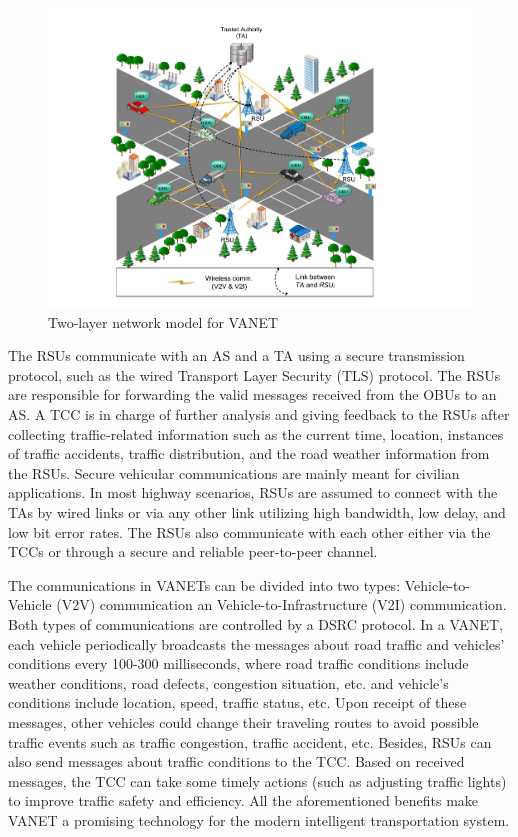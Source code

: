 \documentclass[10pt,journal,letterpaper]{IEEEtran}
\begin{document}
\begin{figure}[h]
    \centering
    \captionsetup{justification=centering}
    \includegraphics[scale=0.45]{Fig1(model).pdf}
    \caption{Two-layer network model for VANET}
    \label{fig1(model)}
\end{figure}
The RSUs communicate with an AS and a TA using a secure transmission
protocol, such as the wired Transport Layer Security (TLS) protocol.
The RSUs are responsible for forwarding the valid messages received
from the OBUs to an AS. A TCC is in charge of further analysis and
giving feedback to the RSUs after collecting traffic-related
information such as the current time, location, instances of traffic
accidents, traffic distribution, and the road weather information
from the RSUs. Secure vehicular communications are mainly meant for
civilian applications. In most highway scenarios, RSUs are assumed
to connect with the TAs by wired links or via any other link
utilizing high bandwidth, low delay, and low bit error rates. The
RSUs also communicate with each other either via the TCCs or through
a secure and reliable peer-to-peer channel.


The communications in VANETs can be divided into two types:
Vehicle-to-Vehicle (V2V) communication an Vehicle-to-Infrastructure
(V2I) communication. Both types of communications are controlled by
a DSRC protocol.  In a VANET, each vehicle periodically broadcasts
the messages about road traffic and vehicles' conditions every
100-300 milliseconds, where road traffic conditions include weather
conditions, road defects, congestion situation, etc. and vehicle's
conditions include location, speed, traffic status, etc.
Upon receipt of these messages, other vehicles could change their
traveling routes to avoid possible traffic events such as traffic
congestion, traffic accident, etc. Besides, RSUs can also send
messages about traffic conditions to the TCC. Based on received
messages, the TCC can take some timely actions (such as adjusting
traffic lights) to improve traffic safety and efficiency. All the
aforementioned benefits make VANET a promising technology for the
modern intelligent transportation system.
\end{document}
